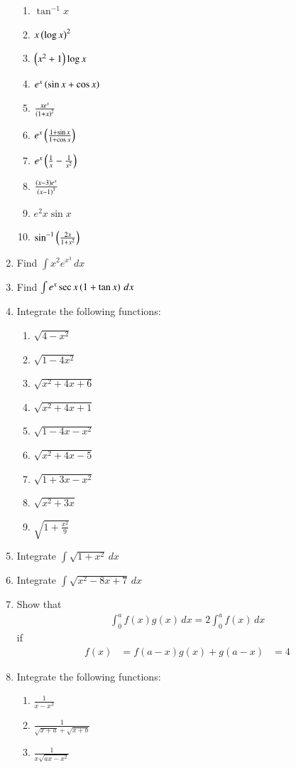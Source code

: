 \begin{enumerate}[label=\arabic*.,ref=\thesubsection.\theenumi]
\begin{enumerate}[label = (\roman*)]
\item $\tan^{-1} x$
\item $x\left(\log x\right)^2$
\item $\left(x^2+1\right)\log x$
\item $e^x\left(\sin x + \cos x\right)$
\item $\frac{ xe^{x}}{\left(1+x\right)^2}$
\item $e^x\left(\frac{1+\sin x}{1 + \cos x}\right)$
\item $e^x\left(\frac{1}{x}-\frac{1}{x^2}\right)$
\item $\frac{ \left(x-3\right)e^{x}}{\left(x-1\right)^3}$
\item $e^2x\sin x$
\item $\sin^{-1} \left(\frac{2x}{1+x^2}\right)$
\end{enumerate}
%
\item Find $\int x^2e^{x^3} \, dx$
\item Find $\int e^{x}\sec x\left(1+\tan x\right)\, dx$
%
\item Integrate the following functions:
\begin{enumerate}[label = (\roman*)]
\item $\sqrt{4-x^2}$
\item $\sqrt{1-4x^2}$
\item $\sqrt{x^2+4x+6}$
\item $\sqrt{x^2+4x+1}$
\item $\sqrt{1-4x-x^2}$
\item $\sqrt{x^2+4x-5}$
\item $\sqrt{1+3x-x^2}$
\item $\sqrt{x^2+3x}$
\item $\sqrt{1+\frac{x^2}{9}}$
\end{enumerate}
%
\item Integrate $\int \sqrt{1+x^2}\, dx$
\item Integrate $\int \sqrt{x^2-8x+7}\, dx$
%
\item Show that 
%
\begin{align}
\int_{0}^{a}f(x)g(x)\,dx
=2\int_{0}^{a}f(x)\,dx
\end{align}
%
if 
\begin{align}
f(x) &=f(a-x)
g(x) + g(a-x) & =4
\end{align}
%
\item Integrate the following functions:
\begin{enumerate}[label = (\roman*)]
\item $\frac{1}{x-x^3}$
\item $\frac{1}{\sqrt{x+a}+\sqrt{x+b}}$
\item $\frac{1}{x\sqrt{ax-x^2}}$

\end{enumerate}
\end{enumerate}
